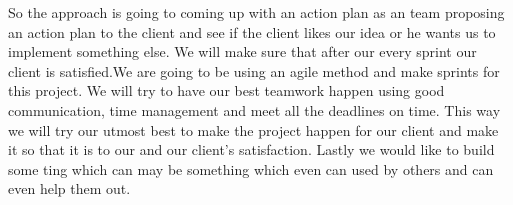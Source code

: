 \documentclass[letterpaper,10pt,titlepage, onecolumn]{IEEEtran}
\begin{document}
    So the approach is going to coming up with an action plan as an team proposing an action plan to the client and see if the client likes our idea or he wants us to implement something else. We will make sure that after our every sprint our client is satisfied.We are going to be using an agile method and make sprints for this project. We will try to have our best teamwork happen using good communication, time management and meet all the deadlines on time. This way we will try our utmost best to make the project happen for our client and make it so that it is to our and our client’s satisfaction. Lastly we would like to build some ting which can may be something which even can used by others and can even help them out. \\

 
   
\end{document}
